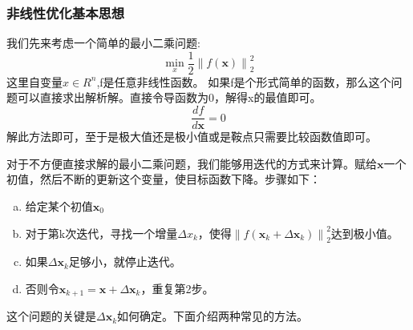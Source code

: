 \subsubsection{非线性优化基本思想}
我们先来考虑一个简单的最小二乘问题:
\begin{equation}
	\min_{x}\frac{1}{2}\left\|f(\boldsymbol{x})\right\|_{2}^{2}
\end{equation}
这里自变量$x \in R^n$,f是任意非线性函数。
如果f是个形式简单的函数，那么这个问题可以直接求出解析解。直接令导函数为0，解得x的最值即可。
\begin{equation}
	\frac{df}{d\boldsymbol{x}}=0
\end{equation}
解此方法即可，至于是极大值还是极小值或是鞍点只需要比较函数值即可。\par
对于不方便直接求解的最小二乘问题，我们能够用迭代的方式来计算。赋给$\boldsymbol{x}$一个初值，然后不断的更新这个变量，使目标函数下降。步骤如下：\par
\begin{enumerate}[(a)]
	\item 给定某个初值$\boldsymbol{x}_0$
	\item 对于第k次迭代，寻找一个增量$\Delta x_k$，使得$\left\|f(\boldsymbol{x}_k+\Delta \boldsymbol{x}_k)\right\|_{2}^{2}$达到极小值。
	\item 如果$\Delta \boldsymbol{x}_k$足够小，就停止迭代。
	\item 否则令$\boldsymbol{x}_{k+1}=\boldsymbol{x}+\Delta \boldsymbol{x}_k$，重复第2步。
\end{enumerate}
这个问题的关键是$\Delta \boldsymbol{x}_k$如何确定。下面介绍两种常见的方法。
